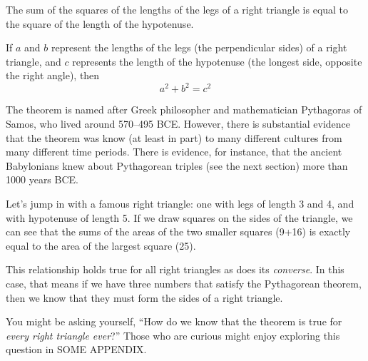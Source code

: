 \begin{boxeddef}
The sum of the squares of the lengths of the \glspl{leg} of a right triangle is equal to the square of the length of the \gls{hypotenuse}.

If $a$ and $b$ represent the lengths of the legs (the perpendicular sides) of a right triangle, and $c$ represents the length of the hypotenuse (the longest side, opposite the right angle), then \[a^2 + b^2 = c^2\]
\end{boxeddef}

The theorem is named after Greek philosopher and mathematician Pythagoras of Samos, who lived around 570--495 BCE. However, there is substantial evidence that the theorem was know (at least in part) to many different cultures from many different time periods. There is evidence, for instance, that the ancient Babylonians knew about Pythagorean triples (see the next section) more than 1000 years BCE.

Let's jump in with a famous right triangle: one with legs of length 3 and 4, and with hypotenuse of length 5. If we draw squares on the sides of the triangle, we can see that the sums of the areas of the two smaller squares (9+16) is exactly equal to the area of the largest square (25).
\begin{center}
\end{center}

This relationship holds true for all right triangles as does its \textit{converse}. In this case, that means if we have three numbers that satisfy the Pythagorean theorem, then we know that they must form the sides of a right triangle.

You might be asking yourself, ``How do we know that the theorem is true for \textit{every right triangle ever}?'' Those who are curious might enjoy exploring this question in SOME APPENDIX.


